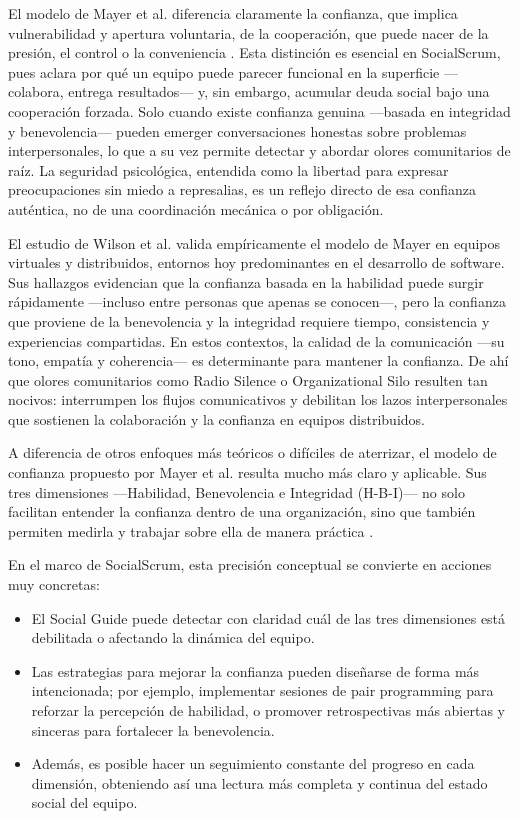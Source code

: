 El modelo de Mayer et al. \cite{mayer_integrative_1995} diferencia claramente la confianza, que implica vulnerabilidad y apertura voluntaria, de la cooperación, que puede nacer de la presión, el control o la conveniencia \cite{mayer_integrative_1995}.
Esta distinción es esencial en SocialScrum, pues aclara por qué un equipo puede parecer funcional en la superficie —colabora, entrega resultados— y, sin embargo, acumular deuda social bajo una cooperación forzada.
Solo cuando existe confianza genuina —basada en integridad y benevolencia— pueden emerger conversaciones honestas sobre problemas interpersonales, lo que a su vez permite detectar y abordar olores comunitarios de raíz.
La seguridad psicológica, entendida como la libertad para expresar preocupaciones sin miedo a represalias, es un reflejo directo de esa confianza auténtica, no de una coordinación mecánica o por obligación.

El estudio de Wilson et al. \cite{wilson_all_2006} valida empíricamente el modelo de Mayer en equipos virtuales y distribuidos, entornos hoy predominantes en el desarrollo de software.
Sus hallazgos evidencian que la confianza basada en la habilidad puede surgir rápidamente —incluso entre personas que apenas se conocen—, pero la confianza que proviene de la benevolencia y la integridad requiere tiempo, consistencia y experiencias compartidas.
En estos contextos, la calidad de la comunicación —su tono, empatía y coherencia— es determinante para mantener la confianza.
De ahí que olores comunitarios como Radio Silence o Organizational Silo resulten tan nocivos: interrumpen los flujos comunicativos y debilitan los lazos interpersonales que sostienen la colaboración y la confianza en equipos distribuidos.

A diferencia de otros enfoques más teóricos o difíciles de aterrizar, el modelo de confianza propuesto por Mayer et al. resulta mucho más claro y aplicable. Sus tres dimensiones —Habilidad, Benevolencia e Integridad (H-B-I)— no solo facilitan entender la confianza dentro de una organización, sino que también permiten medirla y trabajar sobre ella de manera práctica \cite{mayer_integrative_1995}.

En el marco de SocialScrum, esta precisión conceptual se convierte en acciones muy concretas:

\begin{itemize}
    \item El Social Guide puede detectar con claridad cuál de las tres dimensiones está debilitada o afectando la dinámica del equipo.
    \item Las estrategias para mejorar la confianza pueden diseñarse de forma más intencionada; por ejemplo, implementar sesiones de pair programming para reforzar la percepción de habilidad, o promover retrospectivas más abiertas y sinceras para fortalecer la benevolencia.
    \item Además, es posible hacer un seguimiento constante del progreso en cada dimensión, obteniendo así una lectura más completa y continua del estado social del equipo.
\end{itemize}

